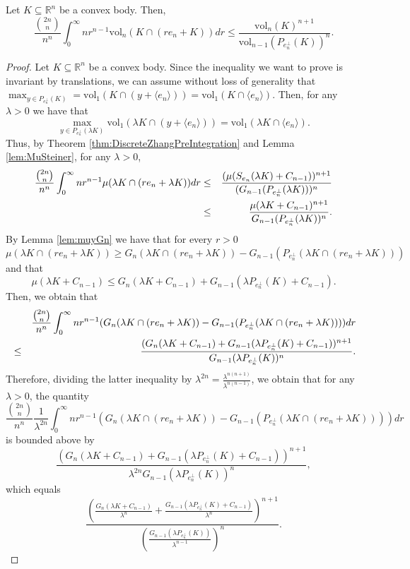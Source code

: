\documentclass[10pt,a4paper]{amsart}
\def\R{\mathbb{R}}
\def\vol{\mathrm{vol}}
\begin{document}
\begin{cor}\label{cor:DiscreteToContinuous}
Let $K\subseteq\R^n$ be a convex body. Then,
$$
\frac{{{2n}\choose{n}}}{n^n}\int_0^\infty nr^{n-1}\vol_n(K\cap(re_n+ K))dr\leq\frac{\vol_n(K)^{n+1}}{\vol_{n-1}(P_{e_n^\perp}(K))^n}.
$$
\end{cor}

\begin{proof}
Let $K\subseteq\R^n$ be a convex body. Since the inequality we want to prove is invariant by translations, we can assume without loss of generality that \\$\displaystyle{\max_{y\in P_{e_n^\perp}(K)}=\vol_1(K\cap(y+\langle e_n\rangle))=\vol_1(K\cap\langle e_n\rangle)}$. Then, for any $\lambda>0$ we have that
$$
\max_{y\in P_{e_n^\perp}(\lambda K)}\vol_1(\lambda K\cap(y+\langle e_n\rangle))=\vol_1(\lambda K\cap\langle e_n\rangle).
$$
Thus, by Theorem \ref{thm:DiscreteZhangPreIntegration} and Lemma \ref{lem:MuSteiner}, for any $\lambda>0$,
\begin{eqnarray*}
\frac{{{2n}\choose{n}}}{n^n}\int_0^\infty nr^{n-1}\mu(\lambda K\cap(re_n+\lambda K))dr&\leq&\frac{(\mu(S_{e_n}(\lambda K)+C_{n-1}))^{n+1}}{(G_{n-1}(P_{e_n^\perp}(\lambda K)))^n}\cr
&\leq&\frac{\mu(\lambda K+C_{n-1})^{n+1}}{G_{n-1}(P_{e_n^\perp}(\lambda K))^n}.
\end{eqnarray*}
By Lemma \ref{lem:muyGn} we have that for every $r>0$
$$
\mu(\lambda K\cap(re_n+\lambda K))\geq G_n(\lambda K\cap(re_n+\lambda K))-G_{n-1}(P_{e_n^\perp}(\lambda K\cap(re_n+\lambda K)))
$$
and that
$$
\mu(\lambda K+C_{n-1})\leq G_n(\lambda K+C_{n-1})+G_{n-1}(\lambda P_{e_n^\perp}(K)+C_{n-1}).
$$
Then, we obtain that
\begin{eqnarray*}
&&\frac{{{2n}\choose{n}}}{n^n}\int_0^\infty nr^{n-1}(G_n(\lambda K\cap(re_n+\lambda K))-G_{n-1}(P_{e_n^\perp}(\lambda K\cap(re_n+\lambda K))))dr\cr
&\leq&\frac{(G_n(\lambda K+C_{n-1})+G_{n-1}(\lambda P_{e_n^\perp}(K)+C_{n-1}))^{n+1}}{G_{n-1}(\lambda P_{e_n^\perp}(K))^n}.
\end{eqnarray*}
Therefore, dividing the latter inequality by $\lambda^{2n}=\frac{\lambda^{n(n+1)}}{\lambda^{n(n-1)}}$, we obtain that for any $\lambda>0$, the quantity
\begin{equation}\label{eq:InequaliProposition41Left}
\frac{{{2n}\choose{n}}}{n^n}\frac{1}{\lambda^{2n}}\int_0^\infty nr^{n-1}(G_n(\lambda K\cap(re_n+\lambda K))-G_{n-1}(P_{e_n^\perp}(\lambda K\cap(re_n+\lambda K))))dr
\end{equation}
is bounded above by
$$
\frac{(G_n(\lambda K+C_{n-1})+G_{n-1}(\lambda P_{e_n^\perp}(K)+C_{n-1}))^{n+1}}{\lambda^{2n}G_{n-1}(\lambda P_{e_n^\perp}(K))^n},
$$
which equals
\begin{equation}\label{eq:InequaliProposition41}
\frac{\left(\frac{G_n(\lambda K+C_{n-1})}{\lambda^n}+\frac{G_{n-1}(\lambda P_{e_n^\perp}(K)+C_{n-1})}{\lambda^n}\right)^{n+1}}{\left(\frac{G_{n-1}(\lambda P_{e_n^\perp}(K))}{\lambda^{n-1}}\right)^n}.
\end{equation}


\end{proof}
\end{document}
